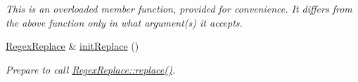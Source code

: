 \begin{DoxyCompactItemize}
\begin{DoxyCompactList}\small\item\em This is an overloaded member function, provided for convenience. It differs from the above function only in what argument(s) it accepts. \end{DoxyCompactList}\item 
\hyperlink{classjpcre2_1_1RegexReplace}{Regex\+Replace} \& \hyperlink{classjpcre2_1_1Regex_ae7235a991492fa88f1bd3fb02d59cd0a}{init\+Replace} ()
\begin{DoxyCompactList}\small\item\em Prepare to call \hyperlink{classjpcre2_1_1RegexReplace_afd087fa7a9bfedec802d1a3dd7edbdd0}{Regex\+Replace\+::replace()}. \end{DoxyCompactList}\end{DoxyCompactItemize}

